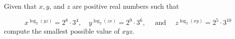 Given that $x, y$, and $z$ are positive real numbers such that

$$
x^{\log _{2}(y z)}=2^{8} \cdot 3^{4}, \quad y^{\log _{2}(z x)}=2^{9} \cdot 3^{6}, \quad \text { and } \quad z^{\log _{2}(x y)}=2^{5} \cdot 3^{10}
$$
compute the smallest possible value of $x y z$.